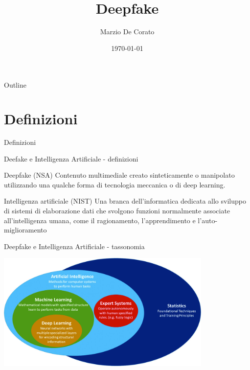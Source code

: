 \documentclass[11pt]{beamer}
\title[Deepfake]{Deepfake}}
\author{Marzio De Corato}
\date{\today}
\begin{document}
\begin{frame}
\vspace{+6.8 cm}  \titlepage
\end{frame}

\usebackgroundtemplate{ } 

\begin{frame}{Outline}
\setcounter{tocdepth}{1}
\begin{center}
\Large
  \tableofcontents
\end{center}
\end{frame}

\section{Definizioni}

\begin{frame}
\begin{center}
\Huge
Definizioni
\end{center}
\end{frame}

\begin{frame}{Deefake e Intelligenza Artificiale - definizioni}

\begin{alertblock}{Deepfake (NSA) \cite{nsa_definition}}
Contenuto multimediale creato sinteticamente o manipolato utilizzando una qualche forma di tecnologia meccanica o di deep learning.
\end{alertblock}

\begin{alertblock}{Intelligenza artificiale (NIST) \cite{nist_definitioN_AI}}
Una branca dell'informatica dedicata allo sviluppo di sistemi di elaborazione dati che svolgono funzioni normalmente associate all'intelligenza umana, come il ragionamento, l'apprendimento e l'auto-miglioramento
\end{alertblock}

\end{frame}

\begin{frame}{Deepfake e Intelligenza Artificiale - tassonomia \cite{tassonomia}}

\begin{center}
\includegraphics[width=0.8\textwidth]{Pic/IA_classification.jpg}
\end{center}

\end{frame}
\end{document}

